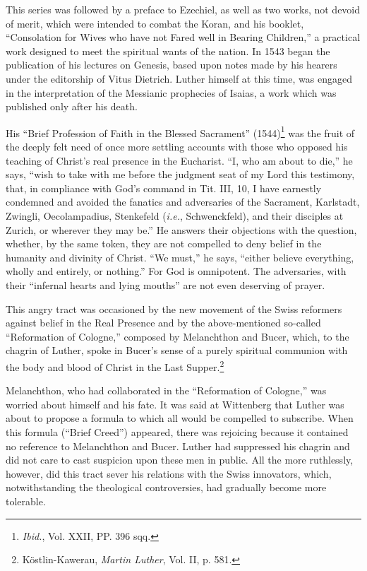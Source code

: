 This series was followed by a preface to Ezechiel, as well as two
works, not devoid of merit, which were intended to combat the
Koran, and his booklet, “Consolation for Wives who have not Fared
well in Bearing Children,” a practical work designed to meet the
spiritual wants of the nation. In 1543 began the publication of his
lectures on Genesis, based upon notes made by his hearers under the
editorship of Vitus Dietrich. Luther himself at this time, was engaged
in the interpretation of the Messianic prophecies of Isaias, a work
which was published only after his death.

His “Brief Profession of Faith in the Blessed Sacrament” (1544)\footnote{\textit{Ibid.}, Vol. XXII, PP. 396 sqq.}
was the fruit of the deeply felt need of once more settling accounts
with those who opposed his teaching of Christ’s real presence in the
Eucharist. “I, who am about to die,” he says, “wish to take with me
before the judgment seat of my Lord this testimony, that, in compliance
with God’s command in Tit. III, 10, I have earnestly condemned and avoided
the fanatics and adversaries of the Sacrament,
Karlstadt, Zwingli, Oecolampadius, Stenkefeld (\textit{i.e.}, Schwenckfeld),
and their disciples at Zurich, or wherever they may be.” He answers
their objections with the question, whether, by the same token, they
are not compelled to deny belief in the humanity and divinity of
Christ. “We must,” he says, “either believe everything, wholly and
entirely, or nothing.” For God is omnipotent. The adversaries, with
their “infernal hearts and lying mouths” are not even deserving of
prayer.

This angry tract was occasioned by the new movement of the Swiss
reformers against belief in the Real Presence and by the above-mentioned
so-called “Reformation of Cologne,” composed by Melanchthon and Bucer,
which, to the chagrin of Luther, spoke in
Bucer’s sense of a purely spiritual communion with the body and blood
of Christ in the Last Supper.\footnote{Köstlin-Kawerau, \textit{Martin Luther}, Vol. II, p. 581.}

Melanchthon, who had collaborated in
the “Reformation of Cologne,” was worried about himself and his
fate. It was said at Wittenberg that Luther was about to propose a
formula to which all would be compelled to subscribe. When this
formula (“Brief Creed”) appeared, there was rejoicing because it
contained no reference to Melanchthon and Bucer. Luther had suppressed
his chagrin and did not care to cast suspicion upon these men
in public. All the more ruthlessly, however, did this tract sever his
relations with the Swiss innovators, which, notwithstanding the theological
controversies, had gradually become more tolerable.

